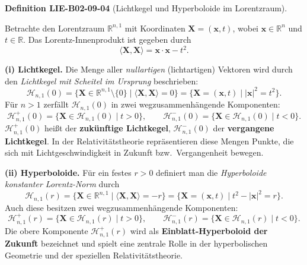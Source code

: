 \documentclass[10pt, letterpaper]{article}
\newcommand{\CustomHeading}[3]{%
  \par\medskip\noindent%
  \textbf{#1 #2} \textnormal{(#3)}.\enskip%
}
\newenvironment{DEF}[2]{\begin{unitbox}\CustomHeading{Definition}{#1}{#2}}{\end{unitbox}}
\begin{document}
\begin{DEF}{LIE-B02-09-04}{Lichtkegel und Hyperboloide im Lorentzraum}
Betrachte den Lorentzraum \(\mathbb{R}^{n,1}\) mit Koordinaten
\(\mathbf{X}=(\mathbf{x},t)\), wobei \(\mathbf{x}\in\mathbb{R}^{n}\) und \(t\in\mathbb{R}\).
Das Lorentz-Innenprodukt ist gegeben durch
\[
\langle \mathbf{X},\mathbf{X}\rangle = \mathbf{x}\cdot\mathbf{x} - t^2.
\]

\textbf{(i) Lichtkegel.}
Die Menge aller \emph{nullartigen} (lichtartigen) Vektoren wird durch den
\emph{Lichtkegel mit Scheitel im Ursprung} beschrieben:
\[
\mathcal{H}_{n,1}(0)
= \{\mathbf{X}\in\mathbb{R}^{n,1}\setminus\{0\} \mid
\langle \mathbf{X},\mathbf{X}\rangle = 0\}
= \{\mathbf{X}=(\mathbf{x},t) \mid |\mathbf{x}|^2 = t^2\}.
\]
Für \(n>1\) zerfällt \(\mathcal{H}_{n,1}(0)\) in zwei wegzusammenhängende Komponenten:
\[
\mathcal{H}_{n,1}^{+}(0)
= \{\mathbf{X}\in\mathcal{H}_{n,1}(0)\mid t>0\}, \qquad
\mathcal{H}_{n,1}^{-}(0)
= \{\mathbf{X}\in\mathcal{H}_{n,1}(0)\mid t<0\}.
\]
\(\mathcal{H}_{n,1}^{+}(0)\) heißt der \textbf{zukünftige Lichtkegel},
\(\mathcal{H}_{n,1}^{-}(0)\) der \textbf{vergangene Lichtkegel}.
In der Relativitätstheorie repräsentieren diese Mengen Punkte,
die sich mit Lichtgeschwindigkeit in Zukunft bzw.\ Vergangenheit bewegen.

\textbf{(ii) Hyperboloide.}
Für ein festes \(r>0\) definiert man die \emph{Hyperboloide konstanter Lorentz-Norm} durch
\[
\mathcal{H}_{n,1}(r)
= \{\mathbf{X}\in\mathbb{R}^{n,1}\mid
\langle \mathbf{X},\mathbf{X}\rangle = -r\}
= \{\mathbf{X}=(\mathbf{x},t)\mid t^2 - |\mathbf{x}|^2 = r\}.
\]
Auch diese besitzen zwei wegzusammenhängende Komponenten:
\[
\mathcal{H}_{n,1}^{+}(r)
= \{\mathbf{X}\in\mathcal{H}_{n,1}(r)\mid t>0\}, \qquad
\mathcal{H}_{n,1}^{-}(r)
= \{\mathbf{X}\in\mathcal{H}_{n,1}(r)\mid t<0\}.
\]
Die obere Komponente \(\mathcal{H}_{n,1}^{+}(r)\) wird als
\textbf{Einblatt-Hyperboloid der Zukunft} bezeichnet und spielt eine
zentrale Rolle in der hyperbolischen Geometrie und der speziellen Relativitätstheorie.
\end{DEF}
\end{document}
